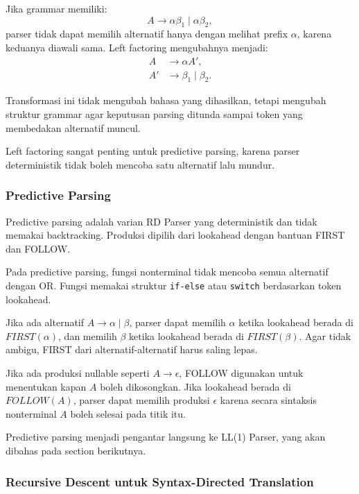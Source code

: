 Jika grammar memiliki:
\[
    A\rightarrow \alpha\beta_1 \mid \alpha\beta_2,
\]
parser tidak dapat memilih alternatif hanya dengan melihat prefix $\alpha$, karena keduanya diawali sama. Left factoring mengubahnya menjadi:
\[
\begin{aligned}
    A &\rightarrow \alpha A',\\
    A' &\rightarrow \beta_1 \mid \beta_2.
\end{aligned}
\]

Transformasi ini tidak mengubah bahasa yang dihasilkan, tetapi mengubah struktur grammar agar keputusan parsing ditunda sampai token yang membedakan alternatif muncul.

Left factoring sangat penting untuk predictive parsing, karena parser deterministik tidak boleh mencoba satu alternatif lalu mundur.

\subsubsection{Predictive Parsing}

\begin{jawab}
Predictive parsing adalah varian RD Parser yang deterministik dan tidak memakai backtracking. Produksi dipilih dari lookahead dengan bantuan FIRST dan FOLLOW.
\end{jawab}

Pada predictive parsing, fungsi nonterminal tidak mencoba semua alternatif dengan OR. Fungsi memakai struktur \texttt{if-else} atau \texttt{switch} berdasarkan token lookahead.

Jika ada alternatif $A\rightarrow\alpha\mid\beta$, parser dapat memilih $\alpha$ ketika lookahead berada di $FIRST(\alpha)$, dan memilih $\beta$ ketika lookahead berada di $FIRST(\beta)$. Agar tidak ambigu, FIRST dari alternatif-alternatif harus saling lepas.

Jika ada produksi nullable seperti $A\rightarrow\epsilon$, FOLLOW digunakan untuk menentukan kapan $A$ boleh dikosongkan. Jika lookahead berada di $FOLLOW(A)$, parser dapat memilih produksi $\epsilon$ karena secara sintaksis nonterminal $A$ boleh selesai pada titik itu.

Predictive parsing menjadi pengantar langsung ke LL(1) Parser, yang akan dibahas pada section berikutnya.

\subsubsection{Recursive Descent untuk Syntax-Directed Translation}


